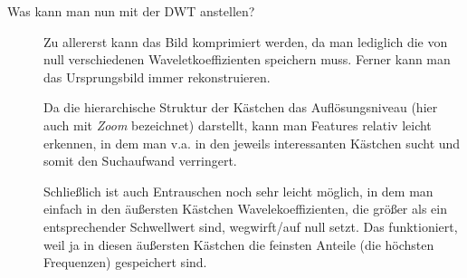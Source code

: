 \begin{description}
  \item[Was kann man nun mit der DWT anstellen?]
    Zu allererst kann das Bild komprimiert werden, da man lediglich die von null verschiedenen Waveletkoeffizienten
    speichern muss. Ferner kann man das Ursprungsbild immer rekonstruieren.

    Da die hierarchische Struktur der Kästchen das Auflösungsniveau (hier auch mit \emph{Zoom} bezeichnet)
    darstellt, kann man Features relativ leicht erkennen, in dem man v.a. in den jeweils interessanten Kästchen sucht
    und somit den Suchaufwand verringert.


    Schließlich ist auch Entrauschen noch sehr leicht möglich, in dem man einfach in den äußersten Kästchen 
    Wavelekoeffizienten, die größer als ein entsprechender Schwellwert sind, wegwirft/auf null setzt. Das funktioniert,
    weil ja in diesen äußersten Kästchen die feinsten Anteile (die höchsten Frequenzen) gespeichert sind.
\end{description}

